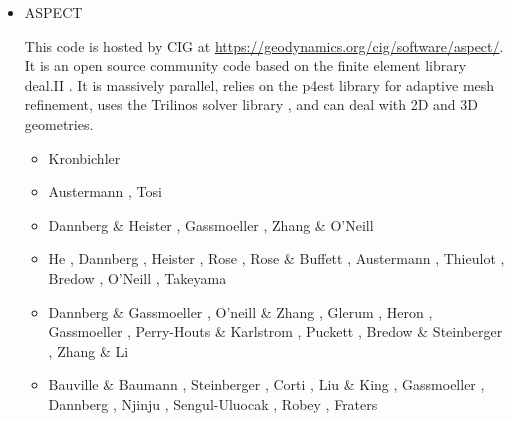 \begin{itemize}
\item {\codefont ASPECT} 

This code is hosted by CIG at \url{https://geodynamics.org/cig/software/aspect/}. 
It is an open source community code based on the finite element library deal.II \cite{bahk07,arbc19,arbd20}. 
It is massively parallel, relies on the p4est library for adaptive mesh refinement,
uses the Trilinos solver library \cite{hewi12}, and can deal with 2D and 3D geometries. 

\begin{scriptsize}
\begin{itemize}
\item[\twothousandtwelve] Kronbichler \etal \cite{krhb12}
\item[\twothousandfifteen] Austermann \etal \cite{aupm15}, Tosi \etal \cite{tosn15}
\item[\twothousandsixteen] Dannberg \& Heister \cite{dahe16}, Gassmoeller \etal \cite{gadb16}, 
                           Zhang \& O'Neill \cite{zhon16}
\item[\twothousandseventeen] He \etal \cite{hepb17}, Dannberg \etal \cite{daef17}, 
                             Heister \etal \cite{hedg17}, Rose \etal \cite{robh17}, 
                             Rose \& Buffett \cite{robu17}, Austermann \etal \cite{aumh17},
                             Thieulot \cite{thie17}, Bredow \etal \cite{brsg17}, 
                             O'Neill \etal \cite{onmz17}, Takeyama \etal \cite{tasm17}
\item[\twothousandeighteen] Dannberg \& Gassmoeller \cite{daga18}, O'neill \& Zhang \cite{onzh18}, 
                            Glerum \etal \cite{gltf18}, Heron \etal \cite{heps18}, 
                            Gassmoeller \etal \cite{galh18}, 
                            Perry-Houts \& Karlstrom \cite{peka18}, Puckett \etal \cite{puth18},
                            Bredow \& Steinberger \cite{brst18b}, Zhang \& Li \cite{zhli18}
\item[\twothousandnineteen] Bauville \& Baumann \cite{baba19}, Steinberger \etal \cite{stbl19}, 
                            Corti \etal \cite{cocf19}, Liu \& King \cite{liki19}, 
                            Gassmoeller \etal \cite{galb19}, Dannberg \etal \cite{dagg19},
                            Njinju \etal \cite{njas19}, Sengul-Uluocak \etal \cite{sepg19}, 
                            Robey \etal \cite{ropu19}, Fraters \etal \cite{frtv19,frbt19}

\end{itemize}
\end{scriptsize}
\end{itemize}

